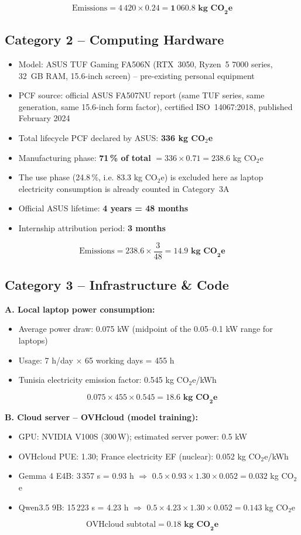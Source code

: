 \[
\text{Emissions} = 4\,420 \times 0.24 = \mathbf{1\,060.8\text{ kg CO}_2\text{e}}
\]

\subsection*{Category 2 -- Computing Hardware}

\begin{itemize}
    \item Model: ASUS TUF Gaming FA506N (RTX~3050, Ryzen~5 7000 series, 32~GB RAM, 15.6-inch screen) -- pre-existing personal equipment
    \item PCF source: official ASUS FA507NU report (same TUF series, same generation, same 15.6-inch form factor), certified ISO~14067:2018, published February 2024
    \item Total lifecycle PCF declared by ASUS: \textbf{336 kg CO$_2$e}
    \item Manufacturing phase: \textbf{71\,\% of total} $= 336 \times 0.71 = 238.6$ kg CO$_2$e
    \item The use phase (24.8\,\%, i.e. 83.3 kg CO$_2$e) is excluded here as laptop electricity consumption is already counted in Category~3A
    \item Official ASUS lifetime: \textbf{4 years = 48 months}
    \item Internship attribution period: \textbf{3 months}
\end{itemize}

\[
\text{Emissions} = 238.6 \times \frac{3}{48} = \mathbf{14.9\text{ kg CO}_2\text{e}}
\]

\subsection*{Category 3 -- Infrastructure \& Code}

\textbf{A. Local laptop power consumption:}
\begin{itemize}
    \item Average power draw: 0.075 kW (midpoint of the 0.05--0.1 kW range for laptops)
    \item Usage: 7 h/day $\times$ 65 working days = 455 h
    \item Tunisia electricity emission factor: 0.545 kg CO$_2$e/kWh
\end{itemize}
\[
0.075 \times 455 \times 0.545 = \mathbf{18.6\text{ kg CO}_2\text{e}}
\]

\textbf{B. Cloud server -- OVHcloud (model training):}
\begin{itemize}
    \item GPU: NVIDIA V100S (300\,W); estimated server power: 0.5 kW
    \item OVHcloud PUE: 1.30; France electricity EF (nuclear): 0.052 kg CO$_2$e/kWh
    \item Gemma 4 E4B: 3\,357 s = 0.93 h $\Rightarrow$ $0.5 \times 0.93 \times 1.30 \times 0.052 = 0.032$ kg CO$_2$e
    \item Qwen3.5 9B: 15\,223 s = 4.23 h $\Rightarrow$ $0.5 \times 4.23 \times 1.30 \times 0.052 = 0.143$ kg CO$_2$e
\end{itemize}
\[
\text{OVHcloud subtotal} = \mathbf{0.18\text{ kg CO}_2\text{e}}
\]

